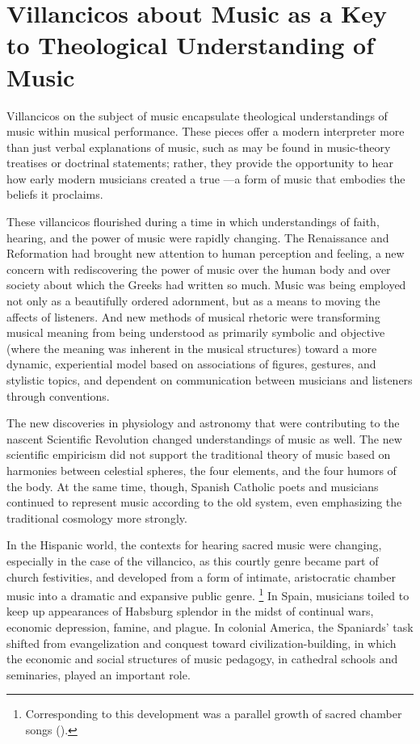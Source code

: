 

\section{%
Villancicos about Music as a Key to Theological Understanding of Music
}

Villancicos on the subject of music encapsulate theological understandings of music within musical performance.
These pieces offer a modern interpreter more than just verbal explanations of music, such as may be found in music-theory treatises or doctrinal statements; rather, they provide the opportunity to hear how early modern musicians created a true ---a form of music that embodies the beliefs it proclaims.

These villancicos flourished during a time in which understandings of faith, hearing, and the power of music were rapidly changing.
The Renaissance and Reformation had brought new attention to human perception and feeling, a new concern with rediscovering the power of music over the human body and over society about which the Greeks had written so much.
Music was being employed not only as a beautifully ordered adornment, but as a means to moving the affects of listeners.
And new methods of musical rhetoric were transforming musical meaning from being understood as primarily symbolic and objective (where the meaning was inherent in the musical structures) toward a more dynamic, experiential model based on associations of figures, gestures, and stylistic topics, and dependent on communication between musicians and listeners through conventions.

The new discoveries in physiology and astronomy that were contributing to the nascent Scientific Revolution changed understandings of music as well.%
	\autocite{Gouk:Sciences}
The new scientific empiricism did not support the traditional theory of music based on harmonies between celestial spheres, the four elements, and the four humors of the body.
At the same time, though, Spanish Catholic poets and musicians continued to represent music according to the old system, even emphasizing the traditional cosmology more strongly.

In the Hispanic world, the contexts for hearing sacred music were changing, especially in the case of the villancico, as this courtly genre became part of church festivities, and developed from a form of intimate, aristocratic chamber music into a dramatic and expansive public genre.%
	\footnote{%
	Corresponding to this development was a parallel growth of sacred chamber songs ().
	}
In Spain, musicians toiled to keep up appearances of Habsburg splendor in the midst of continual wars, economic depression, famine, and plague.
In colonial America, the Spaniards' task shifted from evangelization and conquest toward civilization-building, in which the economic and social structures of music pedagogy, in cathedral schools and seminaries, played an important role.

